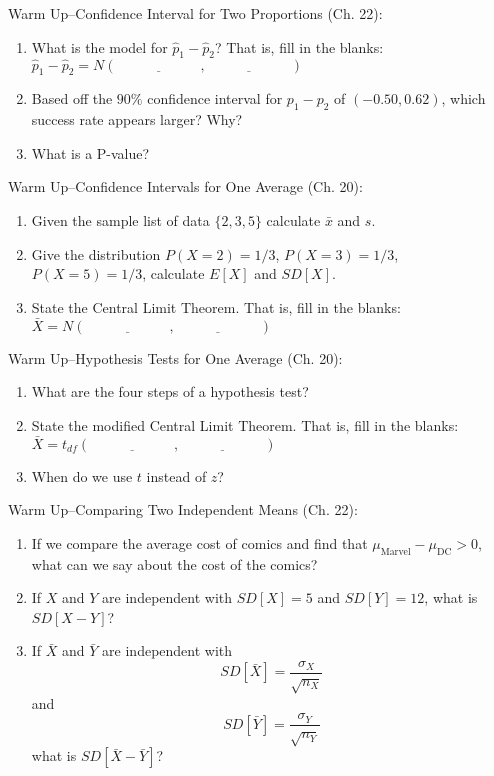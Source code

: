 \documentclass[12pt]{amsart}
\theoremstyle{definition}
\begin{document}
  \begin{framed}
    Warm Up--Confidence Interval for Two Proportions (Ch. 22):
    \begin{enumerate}
    \item What is the model for $\hat{p}_1-\hat{p}_2$? That is, fill in the blanks: $\hat{p}_1-\hat{p}_2=N(\underline{\hspace{1in}},\underline{\hspace{1in}})$
    \item Based off the $90\%$ confidence interval for $p_1-p_2$ of $(-0.50,0.62)$, which success rate appears larger? Why?
    \item What is a P-value?
    \end{enumerate}
    \end{framed}
 
 \begin{framed}
  Warm Up--Confidence Intervals for One Average (Ch. 20):
  \begin{enumerate}
  \item Given the sample list of data $\{2,3,5\}$ calculate $\bar{x}$ and $s$.
  \item Give the distribution $P(X=2)=1/3$, $P(X=3)=1/3$, $P(X=5)=1/3$, calculate $E[X]$ and $SD[X]$.
  \item State the Central Limit Theorem. That is, fill in the blanks: $\bar{X}=N(\underline{\hspace{1in}},\underline{\hspace{1in}})$
  
  \end{enumerate}
  \end{framed}
 
  \begin{framed}
  Warm Up--Hypothesis Tests for One Average (Ch. 20):
  \begin{enumerate}
  \item What are the four steps of a hypothesis test?
  \item State the modified Central Limit Theorem. That is, fill in the blanks: $\bar{X}=t_{df}(\underline{\hspace{1in}},\underline{\hspace{1in}})$
  \item When do we use $t$ instead of $z$?
  \end{enumerate}
  \end{framed}
  \newpage
   \begin{framed}
    Warm Up--Comparing Two Independent Means (Ch. 22):
    \begin{enumerate}
    \item If we compare the average cost of comics and find that $\mu_{\text{Marvel}}-\mu_{\text{DC}}>0$, what can we say about the cost of the comics?
    \item If $X$ and $Y$ are independent with $SD[X]=5$ and $SD[Y]=12$, what is $SD[X-Y]$?
    \item If $\bar{X}$ and $\bar{Y}$ are independent with $$SD[\bar{X}]=\frac{\sigma_X}{\sqrt{n_X}}$$ and $$SD[\bar{Y}]=\frac{\sigma_Y}{\sqrt{n_Y}}$$ what is $SD[\bar{X}-\bar{Y}]$?
    \end{enumerate}
    \end{framed}
  
\end{document}
